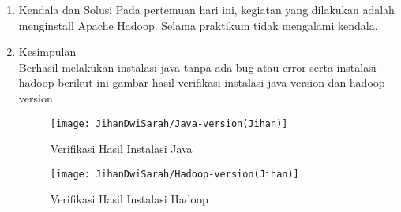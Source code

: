 \begin{enumerate}
\item Kendala dan Solusi
\newline Pada pertemuan hari ini, kegiatan yang dilakukan adalah menginstall Apache Hadoop. Selama praktikum tidak mengalami kendala.

\item Kesimpulan \\
Berhasil melakukan instalasi java tanpa ada bug atau error serta instalasi hadoop berikut ini gambar hasil verifikasi instalasi java version dan hadoop version 

\begin{figure}[!ht]
\texttt{[image: JihanDwiSarah/Java-version(Jihan)]}
\caption{Verifikasi Hasil Instalasi Java}
\label{gam:Java-version(Jihan)}
\end{figure} 

\begin{figure}[!ht]
\texttt{[image: JihanDwiSarah/Hadoop-version(Jihan)]}
\caption{Verifikasi Hasil Instalasi Hadoop}
\label{gam:Hadoop-version(Jihan)}
\end{figure}
\end{enumerate}


